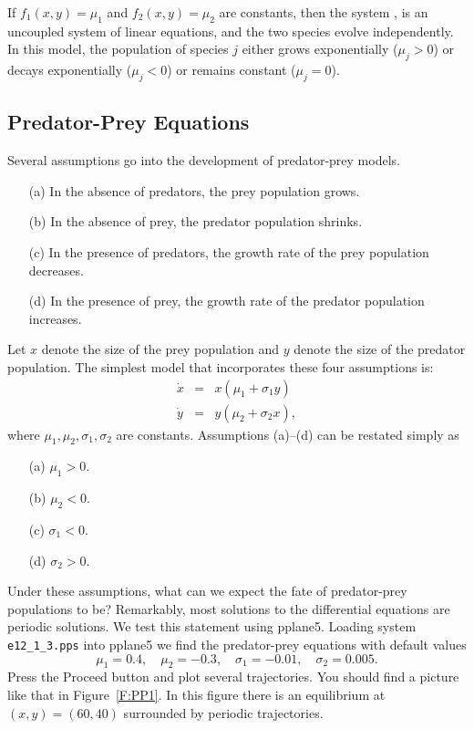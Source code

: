 If $f_1(x,y) = \mu_1$ and $f_2(x,y)=\mu_2$ are constants, then 
the system , is an uncoupled system 
of linear equations, and the two species evolve independently.  
In this model, the population of species $j$ either grows
exponentially ($\mu_j>0$) or decays exponentially ($\mu_j<0$)
or remains constant ($\mu_j=0$).


\subsection*{Predator-Prey Equations}

Several assumptions go into the development of predator-prey 
models. 
\begin{itemize}
\item[(a)]  In the absence of predators, the prey population
grows.
\item[(b)]  In the absence of prey, the predator population 
shrinks.
\item[(c)]  In the presence of predators, the growth rate of
the prey population decreases.
\item[(d)]  In the presence of prey, the growth rate of the 
predator population increases.
\end{itemize}
Let $x$ denote the size of the prey population
 and $y$ denote 
the size of the predator population.  
The simplest model that 
incorporates these four assumptions is:
\begin{equation*} \label{e:PP}
\begin{array}{lcr}
\dot{x} & = & x(\mu_1 + \sigma_1y)\; \\
\dot{y} & = & y(\mu_2 + \sigma_2x),
\end{array}
\end{equation*}
where $\mu_1,\mu_2,\sigma_1,\sigma_2$ are constants.  Assumptions
(a)--(d) can be restated simply as 
\begin{itemize}
\item[(a)]  $\mu_1 > 0$.
\item[(b)]  $\mu_2 < 0$.
\item[(c)]  $\sigma_1 < 0$.
\item[(d)]  $\sigma_2 > 0$.
\end{itemize}
  
Under these assumptions, what can we expect the fate of predator-prey 
populations to be?  Remarkably, most solutions to the differential equations 
 are periodic solutions.  
We test this statement using 
{\sf pplane5}.   
Loading system {\tt e12\_1\_3.pps} into {\sf pplane5}
we find the predator-prey equations with default values
\[
\mu_1 = 0.4, \quad \mu_2 = -0.3, \quad \sigma_1 = -0.01, \quad \sigma_2 = 0.005.
\]
Press the {\sf Proceed} button and plot several trajectories.  You
should find a picture like that in Figure~\ref{F:PP1}.  In this figure 
there is an equilibrium at $(x,y)=(60,40)$ surrounded by periodic 
trajectories. 

